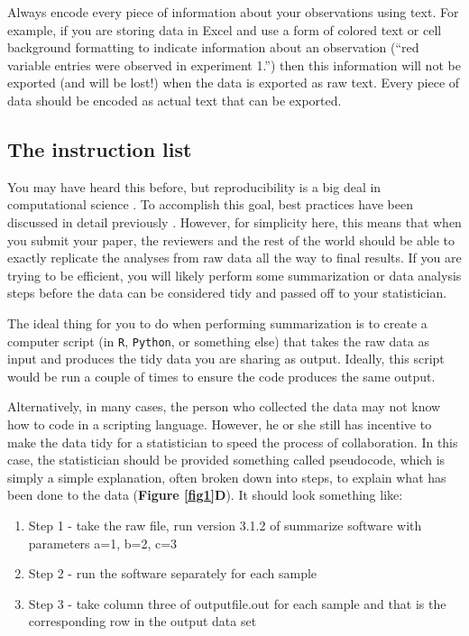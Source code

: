 \documentclass[12pt]{article}
\providecommand{\tightlist}{%
  \setlength{\itemsep}{0pt}\setlength{\parskip}{0pt}}
\begin{document}
Always encode every piece of information about your observations using
text. For example, if you are storing data in Excel and use a form of
colored text or cell background formatting to indicate information about
an observation (``red variable entries were observed in experiment 1.'')
then this information will not be exported (and will be lost!) when the
data is exported as raw text. Every piece of data should be encoded as
actual text that can be exported.

\subsection{The instruction list}\label{the-instruction-list}

You may have heard this before, but reproducibility is a big deal in
computational science \citep{peng_reproducible_2011}. To accomplish this
goal, best practices have been discussed in detail previously
\citep{wilson_good_2016}. However, for simplicity here, this means that
when you submit your paper, the reviewers and the rest of the world
should be able to exactly replicate the analyses from raw data all the
way to final results. If you are trying to be efficient, you will likely
perform some summarization or data analysis steps before the data can be
considered tidy and passed off to your statistician.

The ideal thing for you to do when performing summarization is to create
a computer script (in \texttt{R}, \texttt{Python}, or something else)
that takes the raw data as input and produces the tidy data you are
sharing as output. Ideally, this script would be run a couple of times
to ensure the code produces the same output.

Alternatively, in many cases, the person who collected the data may not
know how to code in a scripting language. However, he or she still has
incentive to make the data tidy for a statistician to speed the process
of collaboration. In this case, the statistician should be provided
something called pseudocode, which is simply a simple explanation, often
broken down into steps, to explain what has been done to the data
(\textbf{Figure \ref{fig1}D}). It should look something like:

\begin{enumerate}
\def\labelenumi{\arabic{enumi}.}
\tightlist
\item
  Step 1 - take the raw file, run version 3.1.2 of summarize software
  with parameters a=1, b=2, c=3
\item
  Step 2 - run the software separately for each sample
\item
  Step 3 - take column three of outputfile.out for each sample and that
  is the corresponding row in the output data set
\end{enumerate}
\end{document}
